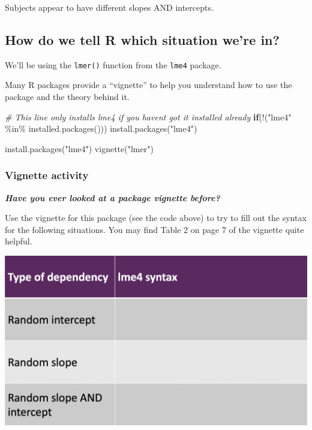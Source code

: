 \documentclass[
  openany]{book}
\newenvironment{Shaded}{\begin{snugshade}}{\end{snugshade}}
\newcommand{\CommentTok}[1]{\textcolor[rgb]{0.56,0.35,0.01}{\textit{#1}}}
\newcommand{\ControlFlowTok}[1]{\textcolor[rgb]{0.13,0.29,0.53}{\textbf{#1}}}
\newcommand{\FunctionTok}[1]{\textcolor[rgb]{0.00,0.00,0.00}{#1}}
\newcommand{\NormalTok}[1]{#1}
\newcommand{\SpecialCharTok}[1]{\textcolor[rgb]{0.00,0.00,0.00}{#1}}
\newcommand{\StringTok}[1]{\textcolor[rgb]{0.31,0.60,0.02}{#1}}
\begin{document}
Subjects appear to have different slopes AND intercepts.

\hypertarget{how-do-we-tell-r-which-situation-were-in}{%
\subsection{How do we tell R which situation we're in?}\label{how-do-we-tell-r-which-situation-were-in}}

We'll be using the \texttt{lmer()} function from the \texttt{lme4} package.

Many R packages provide a ``vignette'' to help you understand how to use the package and the theory behind it.

\begin{Shaded}
\begin{Highlighting}[]
\CommentTok{\# This line only installs lme4 if you haven\textquotesingle{}t got it installed already}
\ControlFlowTok{if}\NormalTok{(}\SpecialCharTok{!}\NormalTok{(}\StringTok{"lme4"} \SpecialCharTok{\%in\%} \FunctionTok{installed.packages}\NormalTok{())) }\FunctionTok{install.packages}\NormalTok{(}\StringTok{"lme4"}\NormalTok{)}

\FunctionTok{install.packages}\NormalTok{(}\StringTok{"lme4"}\NormalTok{)}
\FunctionTok{vignette}\NormalTok{(}\StringTok{"lmer"}\NormalTok{)}
\end{Highlighting}
\end{Shaded}

\hypertarget{vignette-activity}{%
\subsubsection{Vignette activity}\label{vignette-activity}}

\textbf{\emph{Have you ever looked at a package vignette before?}}

Use the vignette for this package (see the code above) to try to fill out the syntax for the following situations. You may find Table 2 on page 7 of the vignette quite helpful.

\includegraphics[width=1\linewidth]{images/m3/table}
\end{document}
